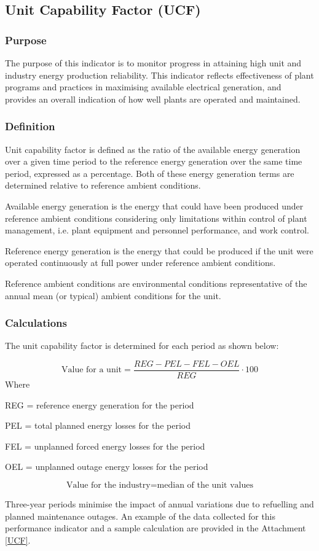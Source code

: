 \subsection{Unit Capability Factor (UCF)}
\subsubsection{Purpose}
The purpose of this indicator is to monitor progress in attaining high
unit and industry energy production reliability. This indicator
reflects effectiveness of plant programs and practices in maximising
available electrical generation, and provides an overall indication of
how well plants are operated and maintained.

\subsubsection{Definition}
Unit capability factor is defined as the ratio of the available energy
generation over a given time period to the reference energy generation
over the same time period, expressed as a percentage. Both of these
energy generation terms are determined relative to reference ambient
conditions.

Available energy generation is the energy that could have been
produced under reference ambient conditions considering only
limitations within control of plant management, i.e. plant equipment
and personnel performance, and work control.

Reference energy generation is the energy that could be produced if
the unit were operated continuously at full power under reference
ambient conditions.

Reference ambient conditions are environmental conditions
representative of the annual mean (or typical) ambient conditions for
the unit.

\subsubsection{Calculations}

The unit capability factor is determined for each period as shown
below:

$$ \text{Value for a unit} = \frac{REG-PEL-FEL-OEL}{REG}\cdot 100 $$
Where

REG  =	reference energy generation for the period

PEL   =	total planned energy losses for the period

FEL   =	unplanned forced energy losses for the period

OEL  =	unplanned outage energy losses for the period

$$\text{Value for the industry} = \text{median of the unit values}$$

Three-year periods minimise the impact of annual variations due to refuelling and planned maintenance outages. An example of the data collected for this performance indicator and a sample calculation are provided in the Attachment \ref{UCF}.
